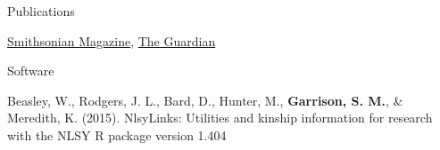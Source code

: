 \documentclass {resume}
\newcommand{\R}{\textup{\textrm{R}}\xspace}
\newcommand{\meb}{{\bf Garrison, S. M.}\xspace}
\begin{document}
\begin{rSection}{\textrm{Publications}}
\begin{etaremune}
{%
\href{http://www.smithsonianmag.com/science-nature/how-long-will-you-live-ask-your-friends-180954201/?no-ist}{Smithsonian Magazine},
\href{http://www.theguardian.com/commentisfree/oliver-burkeman-column/2015/jan/27/your-friends-know-more-about-your-life-than-you-do-including-when-you-might-die}{The Guardian}
}
\end{etaremune}\end{rSection}\vspace{-4mm}

\begin{rSection}{\textrm{Software}}%
\begin{etaremune}\item  Beasley, W., Rodgers, J. L., Bard, D., Hunter, M., \meb, \& Meredith, K. (2015). NlsyLinks: Utilities and kinship information for research with the NLSY \R package version 1.404 \href{http://liveoak.github.io/NlsyLinks}{\color{blue}{http://liveoak.github.io/NlsyLinks}}\end{etaremune}\end{rSection}\pagebreak
\end{document}
